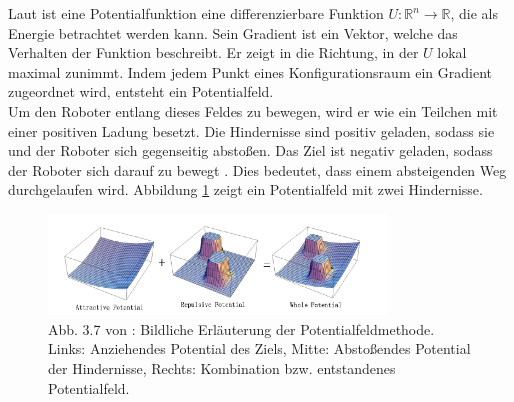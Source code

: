 Laut \cite{Principles:05} ist eine Potentialfunktion eine differenzierbare Funktion $U : \mathbb{R}^{n} \rightarrow \mathbb{R}$, die als Energie betrachtet werden kann. Sein Gradient ist ein Vektor, welche das Verhalten der Funktion beschreibt. Er zeigt in die Richtung, in der $U$ lokal maximal zunimmt. Indem jedem Punkt eines Konfigurationsraum ein Gradient zugeordnet wird, entsteht ein Potentialfeld.\\
Um den Roboter entlang dieses Feldes zu bewegen, wird er wie ein Teilchen mit einer positiven Ladung besetzt. Die Hindernisse sind positiv geladen, sodass sie und der Roboter sich gegenseitig absto{ß}en. Das Ziel ist negativ geladen, sodass der Roboter sich darauf zu bewegt \cite{Yong:92}. Dies bedeutet, dass einem absteigenden Weg durchgelaufen wird. Abbildung \ref*{potentialfield01} zeigt ein Potentialfeld mit zwei Hindernisse.
\begin{figure}[H] %
	\centering
	\includegraphics[width=0.8\textwidth]{images/Potential_Field.png}
	\caption{Abb. 3.7 von \cite{Petersen:15}: Bildliche Erläuterung der Potentialfeldmethode. Links: Anziehendes Potential des Ziels, Mitte: Abstoßendes Potential der Hindernisse, Rechts: Kombination bzw. entstandenes Potentialfeld.}
	\label{potentialfield01}
\end{figure}


